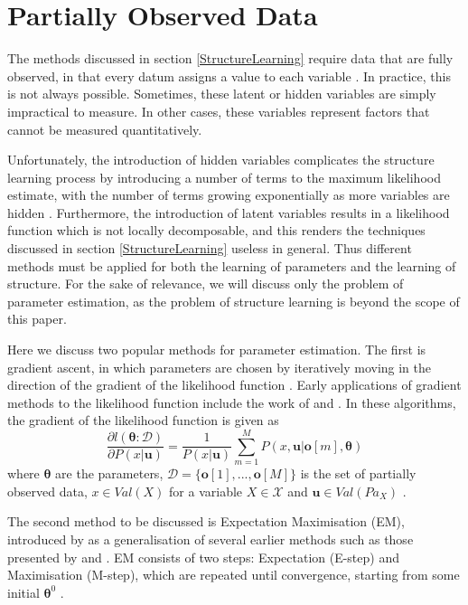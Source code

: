 \documentclass [11pt]{article}
\begin{document}
\section{Partially Observed Data}\label{PartiallyObservedData}
The methods discussed in section \ref{StructureLearning} require data that are fully observed, in that every datum assigns a value to each variable \citep{koller09}. In practice, this is not always possible. Sometimes, these latent or hidden variables are simply impractical to measure. In other cases, these variables represent factors that cannot be measured quantitatively. 

Unfortunately, the introduction of hidden variables complicates the structure learning process by introducing a number of terms to the maximum likelihood estimate, with the number of terms growing exponentially as more variables are hidden \citep{koller09}. Furthermore, the introduction of latent variables results in a likelihood function which is not locally decomposable, and this renders the techniques discussed in section \ref{StructureLearning} useless in general. Thus different methods must be applied for both the learning of parameters and the learning of structure. For the sake of relevance, we will discuss only the problem of parameter estimation, as the problem of structure learning is beyond the scope of this paper.

Here we discuss two popular methods for parameter estimation. The first is gradient ascent, in which parameters are chosen by iteratively moving in the direction of the gradient of the likelihood function \citep{koller09}. Early applications of gradient methods to the likelihood function include the work of \cite{thiesson95} and \cite{binder97}. In these algorithms, the gradient of the likelihood function is given as
\begin{equation*}
\frac{\partial l(\boldsymbol{\theta}:\mathcal{D})}{\partial P(x|\boldsymbol{u})} = \frac{1}{P(x|\boldsymbol{u})}\sum_{m=1}^{M}P(x,\boldsymbol{u}|\boldsymbol{o}[m],\boldsymbol{\theta})
\end{equation*}
where $\boldsymbol{\theta}$ are the parameters, $\mathcal{D} = \{\boldsymbol{o}[1],...,\boldsymbol{o}[M]\}$ is the set of partially observed data, $x \in Val(X)$ for a variable $X \in \mathcal{X}$ and $\boldsymbol{u} \in Val(Pa_{X})$ \citep{koller09}.

The second method to be discussed is Expectation Maximisation (EM), introduced by \cite{dempster77} as a generalisation of several earlier methods such as those presented by \cite{baum70} and \cite{orchard72}. EM consists of two steps: Expectation (E-step) and Maximisation (M-step), which are repeated until convergence, starting from some initial $\boldsymbol{\theta}^{0}$  \citep{koller09}. 
\end{document}
